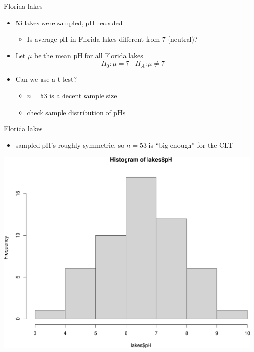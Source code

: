 \documentclass[
  10pt,
  ignorenonframetext,
]{beamer}
\newenvironment{Shaded}{\begin{snugshade}}{\end{snugshade}}
\newcommand{\FunctionTok}[1]{\textcolor[rgb]{0.00,0.00,0.00}{#1}}
\newcommand{\NormalTok}[1]{#1}
\newcommand{\OtherTok}[1]{\textcolor[rgb]{0.56,0.35,0.01}{#1}}
\newcommand{\SpecialCharTok}[1]{\textcolor[rgb]{0.00,0.00,0.00}{#1}}
\newcommand{\StringTok}[1]{\textcolor[rgb]{0.31,0.60,0.02}{#1}}
\providecommand{\tightlist}{%
  \setlength{\itemsep}{0pt}\setlength{\parskip}{0pt}}
\let\oldShaded\Shaded
\let\endoldShaded\endShaded
\renewenvironment{Shaded}{\tiny\oldShaded}{\endoldShaded}
\begin{document}
\begin{frame}{Florida lakes}
\protect\hypertarget{florida-lakes}{}
\begin{itemize}
\item
  53 lakes were sampled, pH recorded

  \begin{itemize}
  \tightlist
  \item
    Is average pH in Florida lakes different from 7 (neutral)?
  \end{itemize}
\item
  Let \(\mu\) be the mean pH for all Florida lakes \[
  H_0: \mu = 7 \ \ \ \  H_A: \mu \neq 7
  \]
\item
  Can we use a t-test?

  \begin{itemize}
  \item
    \(n=53\) is a decent sample size
  \item
    check sample distribution of pHs
  \end{itemize}
\end{itemize}
\end{frame}

\begin{frame}[fragile]{Florida lakes}
\protect\hypertarget{florida-lakes-1}{}
\begin{itemize}
\tightlist
\item
  sampled pH's roughly symmetric, so \(n=53\) is ``big enough'' for the
  CLT
\end{itemize}

\begin{Shaded}
\end{Shaded}

\includegraphics{Day1_files/figure-beamer/unnamed-chunk-2-1.pdf}
\end{frame}
\end{document}
